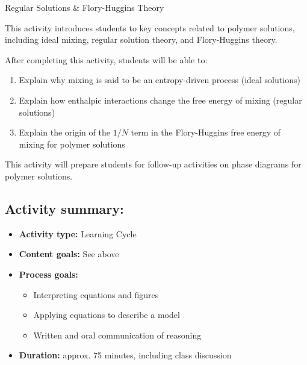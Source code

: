 %
%
%
%

\renewcommand{\figpath}{content/polymphys/solution-thermo/flory-huggins/figs}
\renewcommand{\labelbase}{flory-huggins}

\begin{activity}{Regular Solutions \& Flory-Huggins Theory}

\begin{instructornotes}

	This activity introduces students to key concepts related to polymer solutions, including ideal mixing, regular solution theory, and Flory-Huggins theory.
	
	After completing this activity, students will be able to:
			\begin{enumerate}
				\item Explain why mixing is said to be an entropy-driven process (ideal solutions)
				\item Explain how enthalpic interactions change the free energy of mixing (regular solutions)
				\item Explain the origin of the $1/N$ term in the Flory-Huggins free energy of mixing for polymer solutions
			\end{enumerate}
	This activity will prepare students for follow-up activities on phase diagrams for polymer solutions.
			
	\subsection*{Activity summary:}
	\begin{itemize}
		\item \textbf{Activity type:} Learning Cycle
		\item \textbf{Content goals:} See above %
		\item \textbf{Process goals:} %
			\begin{itemize}
				\item Interpreting equations and figures
				\item Applying equations to describe a model
				\item Written and oral communication of reasoning
			\end{itemize}
		\item \textbf{Duration:} approx. 75 minutes, including class discussion
		

\end{itemize}
\end{instructornotes}
\end{activity}
